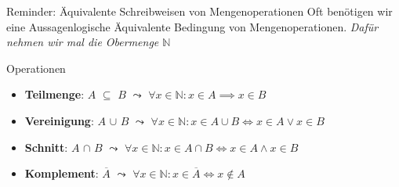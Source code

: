 %
%
%
%

\begin{frame}[fragile]{Reminder: Äquivalente Schreibweisen von Mengenoperationen}
    Oft benötigen wir eine Aussagenlogische Äquivalente Bedingung von Mengenoperationen. \emph{Dafür nehmen wir mal die Obermenge $\mathbb{N}$}
    \begin{block}{Operationen}
        \begin{itemize}
            \item\textbf{Teilmenge}: $A$ $\subseteq$ $B$ $\leadsto$ $\forall x \in \mathbb{N} : x \in A \implies x \in B$\\
            \item \textbf{Vereinigung}: $A$ $\cup$ $B$ $\leadsto$ $\forall x \in \mathbb{N} : x \in A \cup B \iff x \in A \vee x \in B$\\
            \item \textbf{Schnitt}: $A$ $\cap$ $B$ $\leadsto$ $\forall x \in \mathbb{N} : x \in A \cap B \iff x \in A \wedge x \in B$\\
            \item \textbf{Komplement}: $\overline{A}$ $\leadsto$ $\forall x \in \mathbb{N} : x \in \overline{A} \iff x \notin A$
        \end{itemize}
    \end{block}

\end{frame}

